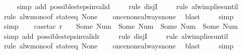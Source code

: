 \begin{isabellebody}
\ \ \ \isamarkupfalse%
\ {\isacharparenleft}simp\ add{\isacharcolon}\ possible{\isacharunderscore}steps{\isacharunderscore}{}{\isacharunderscore}invalid{\isacharparenright}\isanewline
\ \ \ \isamarkupfalse%
\ {\isacharparenleft}rule\ disjI{}{\isacharparenright}\isanewline
\ \ \ \isamarkupfalse%
\ {\isacharparenleft}rule\ alw{\isacharunderscore}implies{\isacharunderscore}until{\isacharparenright}\isanewline
\ \ \ \isamarkupfalse%
\ {\isacharparenleft}rule\ alw{\isacharunderscore}mono{\isacharbrackleft}of\ {\isachardoublequoteopen}state{\isacharunderscore}eq\ None{\isachardoublequoteclose}{\isacharbrackright}{\isacharparenright}\isanewline
\ \ \isamarkupfalse%
\ once{\isacharunderscore}none{\isacharunderscore}always{\isacharunderscore}none\ \isamarkupfalse%
\ blast\isanewline
\ \ \ \isamarkupfalse%
\ simp\isanewline
\ \ \isamarkupfalse%
\ simp\isanewline
\ \ \isamarkupfalse%
\ {\isacharparenleft}case{\isacharunderscore}tac\ {\isachardoublequoteopen}r\ {\isachardollar}\ {}\ {\isasymnotin}\ {\isacharbraceleft}Some\ {\isacharparenleft}Num\ {}{\isacharparenright}{\isacharcomma}\ Some\ {\isacharparenleft}Num\ {}{\isacharparenright}{\isacharcomma}\ Some\ {\isacharparenleft}Num\ {}{\isacharparenright}{\isacharcomma}\ Some\ {\isacharparenleft}Num\ {}{\isacharparenright}{\isacharbraceright}{\isachardoublequoteclose}{\isacharparenright}\isanewline
\ \ \ \isamarkupfalse%
\ {\isacharparenleft}simp\ add{\isacharcolon}\ possible{\isacharunderscore}steps{\isacharunderscore}{}{\isacharunderscore}invalid{\isacharunderscore}r{}{\isacharparenright}\isanewline
\ \ \ \isamarkupfalse%
\ {\isacharparenleft}rule\ disjI{}{\isacharparenright}\isanewline
\ \ \ \isamarkupfalse%
\ {\isacharparenleft}rule\ alw{\isacharunderscore}implies{\isacharunderscore}until{\isacharparenright}\isanewline
\ \ \ \isamarkupfalse%
\ {\isacharparenleft}rule\ alw{\isacharunderscore}mono{\isacharbrackleft}of\ {\isachardoublequoteopen}state{\isacharunderscore}eq\ None{\isachardoublequoteclose}{\isacharbrackright}{\isacharparenright}\isanewline
\ \ \isamarkupfalse%
\ once{\isacharunderscore}none{\isacharunderscore}always{\isacharunderscore}none\ \isamarkupfalse%
\ blast\isanewline
\ \ \ \isamarkupfalse%
\ simp\isanewline

\end{isabellebody}
